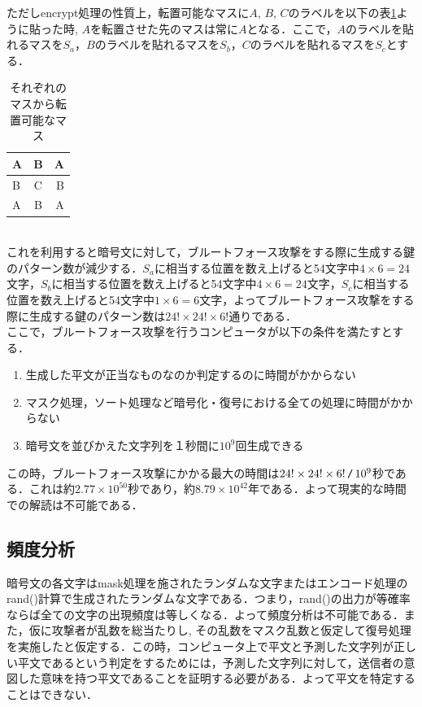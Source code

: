 \documentclass[a4j,titlepage]{jsarticle}
\newcommand{\code}[1]{ \texttt{\detokenize{#1}} }
\begin{document}
ただしencrypt処理の性質上，転置可能なマスに\(A\), \(B\), \(C\)のラベルを以下の表\ref{fig:trans-masu}ように貼った時, \(A\)を転置させた先のマスは常に\(A\)となる．ここで，\(A\)のラベルを貼れるマスを\(S_a\)，\(B\)のラベルを貼れるマスを\(S_b\)，\(C\)のラベルを貼れるマスを\(S_c\)とする．
\begin{table}[htb]
  \centering
  \begin{tabular}{|l|c|r|} \hline
    A & B & A \\ \hline
    B & C & B \\ \hline
    A & B & A \\ \hline
  \end{tabular}
  \caption{それぞれのマスから転置可能なマス}
  \label{fig:trans-masu}
\end{table}\\
これを利用すると暗号文に対して，ブルートフォース攻撃をする際に生成する鍵のパターン数が減少する．\(S_a\)に相当する位置を数え上げると54文字中\(4\times6=24\)文字，\(S_b\)に相当する位置を数え上げると54文字中\(4\times6=24\)文字，\(S_c\)に相当する位置を数え上げると54文字中\(1\times6=6\)文字，よってブルートフォース攻撃をする際に生成する鍵のパターン数は\(24!\times24!\times6!\)通りである．\\
ここで，ブルートフォース攻撃を行うコンピュータが以下の条件を満たすとする．
\begin{enumerate}
  \item 生成した平文が正当なものなのか判定するのに時間がかからない
  \item マスク処理，ソート処理など暗号化・復号における全ての処理に時間がかからない
  \item 暗号文を並びかえた文字列を１秒間に\(10^9\)回生成できる
\end{enumerate}
この時，ブルートフォース攻撃にかかる最大の時間は\(24! \times 24! \times 6!\,\code{/}\,10^9\)秒である．これは約\(2.77 \times 10^{50}\)秒であり，約\(8.79 \times 10^{42}\)年である．よって現実的な時間での解読は不可能である．

\subsection{頻度分析}
暗号文の各文字はmask処理を施されたランダムな文字またはエンコード処理のrand()計算で生成されたランダムな文字である．つまり，rand()の出力が等確率ならば全ての文字の出現頻度は等しくなる．よって頻度分析は不可能である．また，仮に攻撃者が乱数を総当たりし, その乱数をマスク乱数と仮定して復号処理を実施したと仮定する．この時，コンピュータ上で平文と予測した文字列が正しい平文であるという判定をするためには，予測した文字列に対して，送信者の意図した意味を持つ平文であることを証明する必要がある．よって平文を特定することはできない．
\end{document}
